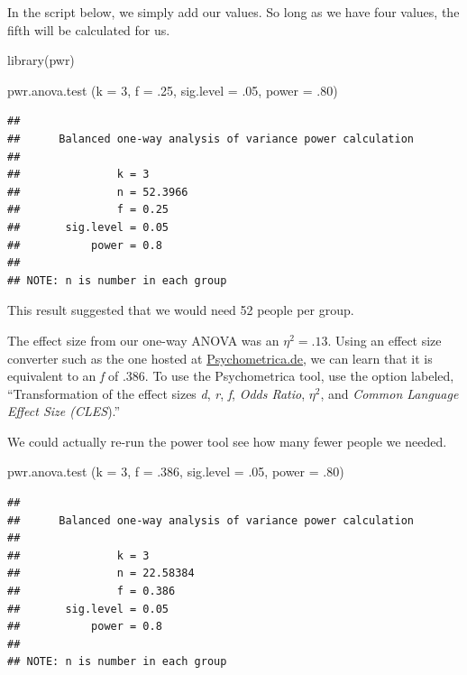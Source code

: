 \documentclass[
  english,
]{book}
\newenvironment{Shaded}{\begin{snugshade}}{\end{snugshade}}
\newcommand{\AttributeTok}[1]{\textcolor[rgb]{0.77,0.63,0.00}{#1}}
\newcommand{\DecValTok}[1]{\textcolor[rgb]{0.00,0.00,0.81}{#1}}
\newcommand{\FunctionTok}[1]{\textcolor[rgb]{0.00,0.00,0.00}{#1}}
\newcommand{\NormalTok}[1]{#1}
\begin{document}
In the script below, we simply add our values. So long as we have four values, the fifth will be calculated for us.

\begin{Shaded}
\begin{Highlighting}[]
\FunctionTok{library}\NormalTok{(pwr)}

\FunctionTok{pwr.anova.test}\NormalTok{ (}\AttributeTok{k =} \DecValTok{3}\NormalTok{, }\AttributeTok{f =}\NormalTok{ .}\DecValTok{25}\NormalTok{, }\AttributeTok{sig.level =}\NormalTok{ .}\DecValTok{05}\NormalTok{, }\AttributeTok{power =}\NormalTok{ .}\DecValTok{80}\NormalTok{)}
\end{Highlighting}
\end{Shaded}

\begin{verbatim}
## 
##      Balanced one-way analysis of variance power calculation 
## 
##               k = 3
##               n = 52.3966
##               f = 0.25
##       sig.level = 0.05
##           power = 0.8
## 
## NOTE: n is number in each group
\end{verbatim}

This result suggested that we would need 52 people per group.

The effect size from our one-way ANOVA was an \(\eta^2 = .13\). Using an effect size converter such as the one hosted at \href{https://www.psychometrica.de/effect_size.html}{Psychometrica.de}, we can learn that it is equivalent to an \emph{f} of .386. To use the Psychometrica tool, use the option labeled, ``Transformation of the effect sizes \emph{d}, \emph{r}, \emph{f}, \emph{Odds Ratio}, \(\eta^2\), and \emph{Common Language Effect Size (CLES}).''

We could actually re-run the power tool see how many fewer people we needed.

\begin{Shaded}
\begin{Highlighting}[]
\FunctionTok{pwr.anova.test}\NormalTok{ (}\AttributeTok{k =} \DecValTok{3}\NormalTok{, }\AttributeTok{f =}\NormalTok{ .}\DecValTok{386}\NormalTok{, }\AttributeTok{sig.level =}\NormalTok{ .}\DecValTok{05}\NormalTok{, }\AttributeTok{power =}\NormalTok{ .}\DecValTok{80}\NormalTok{)}
\end{Highlighting}
\end{Shaded}

\begin{verbatim}
## 
##      Balanced one-way analysis of variance power calculation 
## 
##               k = 3
##               n = 22.58384
##               f = 0.386
##       sig.level = 0.05
##           power = 0.8
## 
## NOTE: n is number in each group
\end{verbatim}
\end{document}
